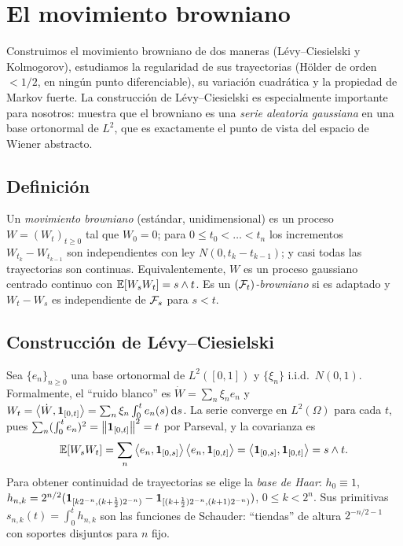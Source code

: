 \chapter{El movimiento browniano}\label{cap:browniano}

\begin{panorama}
Construimos el movimiento browniano de dos maneras (Lévy--Ciesielski y Kolmogorov),
estudiamos la regularidad de sus trayectorias (Hölder de orden $<1/2$, en ningún punto
diferenciable), su variación cuadrática y la propiedad de Markov fuerte. La construcción
de Lévy--Ciesielski es especialmente importante para nosotros: muestra que el browniano
es una \emph{serie aleatoria gaussiana} en una base ortonormal de $L^2$, que es exactamente el
punto de vista del espacio de Wiener abstracto.
\end{panorama}

\section{Definición}

\begin{definicion}
Un \emph{movimiento browniano} (estándar, unidimensional) es un proceso
$W=(W_t)_{t\ge0}$ tal que $W_0=0$; para $0\le t_0<\dots<t_n$ los incrementos $W_{t_k}-W_{t_{k-1}}$
son independientes con ley $N(0,t_k-t_{k-1})$; y casi todas las trayectorias son continuas. Equivalentemente,
$W$ es un proceso gaussiano centrado continuo con $\mathbb{E}[W_sW_t]=s\wedge t$. Es un
\emph{$(\mathcal{F}_t)$-browniano} si es adaptado y $W_t-W_s$ es independiente de $\mathcal{F}_s$ para $s<t$.
\end{definicion}

\section{Construcción de Lévy--Ciesielski}
Sea $\{e_n\}_{n\ge0}$ una base ortonormal de $L^2([0,1])$ y $\{\xi_n\}$ i.i.d.\ $N(0,1)$. Formalmente, el ``ruido
blanco'' es $\dot W=\sum_n\xi_ne_n$ y $W_t=\left\langle \dot W, \mathbf{1}_{[0,t]}\right\rangle=\sum_n\xi_n\int_0^te_n(s)\,\mathrm{d} s$. La serie converge en $L^2(\Omega)$
para cada $t$, pues $\sum_n(\int_0^te_n)^2=\left\lVert \mathbf{1}_{[0,t]}\right\rVert^2=t$ por Parseval, y la covarianza es
\[
  \mathbb{E}[W_sW_t]=\sum_n\left\langle e_n, \mathbf{1}_{[0,s]}\right\rangle\left\langle e_n, \mathbf{1}_{[0,t]}\right\rangle=\left\langle \mathbf{1}_{[0,s]}, \mathbf{1}_{[0,t]}\right\rangle=s\wedge t.
\]
Para obtener continuidad de trayectorias se elige la \emph{base de Haar}: $h_0\equiv1$, $h_{n,k}=
2^{n/2}(\mathbf{1}_{[k2^{-n},(k+\frac12)2^{-n})}-\mathbf{1}_{[(k+\frac12)2^{-n},(k+1)2^{-n})})$, $0\le k<2^n$. Sus primitivas $s_{n,k}(t)=\int_0^th_{n,k}$ son
las funciones de Schauder: ``tiendas'' de altura $2^{-n/2-1}$ con soportes disjuntos para $n$ fijo.

